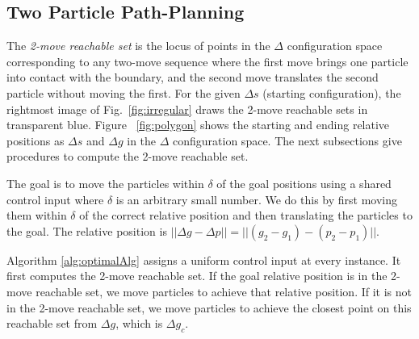 \subsection{Two Particle Path-Planning}


  The \emph{2-move reachable set} is the locus of points in the $\Delta$ configuration space corresponding to any two-move sequence where the first move brings one particle into contact with the boundary, and the second move translates the second particle without moving the first.
 For the given $\Delta s$ (starting configuration), the rightmost image of Fig.~\ref{fig:irregular} draws the 2-move reachable sets  in transparent blue.
 Figure ~\ref{fig:polygon} shows the starting and ending relative positions as $\Delta s$ and $\Delta g$ in the $\Delta$ configuration space.  The next subsections give procedures to compute the 2-move reachable set.%
 
The goal is to move the particles within $\delta$ of the goal positions using a shared control input where $\delta$ is an arbitrary small number. We do this by first moving them within $\delta$ of the correct relative position and then translating the particles to the goal. The relative position is $||\Delta g - \Delta p || = ||(g_2-g_1)- (p_2-p_1)||$.  

 Algorithm \ref{alg:optimalAlg} assigns a uniform control input at every instance.
 It first computes the 2-move reachable set. If the goal relative position is in the 2-move reachable set, we move particles to achieve that relative position. If it is not in the 2-move reachable set, we move particles to achieve the closest point on this reachable set from $\Delta g$, which is $\Delta g_c$. 

